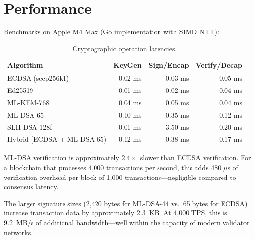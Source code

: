 \section{Performance}

\label{sec:perf}

Benchmarks on Apple M4 Max (Go implementation with SIMD NTT):

\begin{table}[h]
\centering
\begin{tabular}{lrrr}
\toprule
\textbf{Algorithm} & \textbf{KeyGen} & \textbf{Sign/Encap} &
\textbf{Verify/Decap} \\
\midrule
ECDSA (secp256k1) & 0.02 ms & 0.03 ms & 0.05 ms \\
Ed25519 & 0.01 ms & 0.02 ms & 0.04 ms \\
\midrule
ML-KEM-768 & 0.04 ms & 0.05 ms & 0.04 ms \\
ML-DSA-65 & 0.10 ms & 0.35 ms & 0.12 ms \\
SLH-DSA-128f & 0.01 ms & 3.50 ms & 0.20 ms \\
\midrule
Hybrid (ECDSA + ML-DSA-65) & 0.12 ms & 0.38 ms & 0.17 ms \\
\bottomrule
\end{tabular}
\caption{Cryptographic operation latencies.}
\label{tab:latency}
\end{table}

ML-DSA verification is approximately $2.4\times$ slower than ECDSA
verification.  For a blockchain that processes 4,000 transactions per
second, this adds 480 $\mu$s of verification overhead per block of
1,000 transactions---negligible compared to consensus latency.

The larger signature sizes (2,420 bytes for ML-DSA-44 vs.\ 65 bytes
for ECDSA) increase transaction data by approximately 2.3~KB.  At
4,000 TPS, this is 9.2~MB/s of additional bandwidth---well within the
capacity of modern validator networks.

